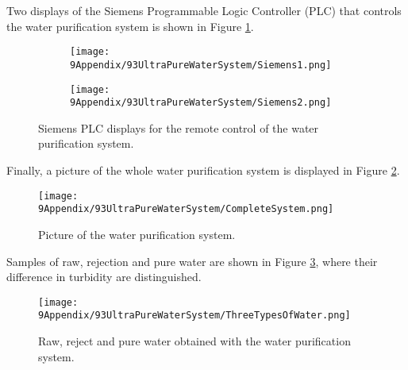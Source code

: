 Two displays of the Siemens Programmable Logic Controller (PLC) that controls the water purification system is shown in Figure \ref{fig:Siemens}.
\begin{figure}
\centering
    \begin{subfigure}[b]{0.6\textwidth}
    \centering
    \texttt{[image: 9Appendix/93UltraPureWaterSystem/Siemens1.png]}  
    \caption{}
    \end{subfigure}
    \hfill
    \begin{subfigure}[b]{0.6\textwidth}
    \centering
    \texttt{[image: 9Appendix/93UltraPureWaterSystem/Siemens2.png]}  
    \caption{}
    \end{subfigure}
 \caption{Siemens PLC displays for the remote control of the water purification system.}
 \label{fig:Siemens}
\end{figure}
Finally, a picture of the whole water purification system is displayed in Figure \ref{fig:CompleteSystem}.
\begin{figure}[htbp]
\centering
\texttt{[image: 9Appendix/93UltraPureWaterSystem/CompleteSystem.png]}
\caption{Picture of the water purification system.\label{fig:CompleteSystem}}
\end{figure}
Samples of raw, rejection and pure water are shown in Figure \ref{fig:ThreeTypesOfWater}, where their difference in turbidity are distinguished.
\begin{figure}[htbp]
\centering
\texttt{[image: 9Appendix/93UltraPureWaterSystem/ThreeTypesOfWater.png]}
\caption{Raw, reject and pure water obtained with the water purification system.\label{fig:ThreeTypesOfWater}}
\end{figure}